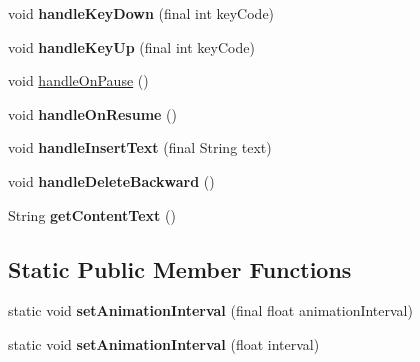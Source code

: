\begin{DoxyCompactItemize}
void {\bfseries handle\+Key\+Down} (final int key\+Code)
\item 
\mbox{\label{classorg_1_1cocos2dx_1_1lib_1_1Cocos2dxRenderer_a32bcc9f43575cf394f5dcc0ac1f1ed4e}} 
void {\bfseries handle\+Key\+Up} (final int key\+Code)
\item 
void \hyperlink{classorg_1_1cocos2dx_1_1lib_1_1Cocos2dxRenderer_a253bb3076421742699afad4404a27dcd}{handle\+On\+Pause} ()
\item 
\mbox{\label{classorg_1_1cocos2dx_1_1lib_1_1Cocos2dxRenderer_af4265fd8b49921ea615c126eac200a1d}} 
void {\bfseries handle\+On\+Resume} ()
\item 
\mbox{\label{classorg_1_1cocos2dx_1_1lib_1_1Cocos2dxRenderer_a1a72056de6c7598ed9b157c707344e97}} 
void {\bfseries handle\+Insert\+Text} (final String text)
\item 
\mbox{\label{classorg_1_1cocos2dx_1_1lib_1_1Cocos2dxRenderer_a0864ebd6fed58ccd2b0a37b59a1171b1}} 
void {\bfseries handle\+Delete\+Backward} ()
\item 
\mbox{\label{classorg_1_1cocos2dx_1_1lib_1_1Cocos2dxRenderer_a31fb8e615dd24e51d1651e6112cadc7e}} 
String {\bfseries get\+Content\+Text} ()
\end{DoxyCompactItemize}
\subsection*{Static Public Member Functions}
\begin{DoxyCompactItemize}
\item 
\mbox{\label{classorg_1_1cocos2dx_1_1lib_1_1Cocos2dxRenderer_aaa7f65bc23f5dd9f9a106a1d0d67b282}} 
static void {\bfseries set\+Animation\+Interval} (final float animation\+Interval)
\item 
\mbox{\label{classorg_1_1cocos2dx_1_1lib_1_1Cocos2dxRenderer_aa808c143c76f35d00be428cdf08afe08}} 
static void {\bfseries set\+Animation\+Interval} (float interval)
\end{DoxyCompactItemize}


